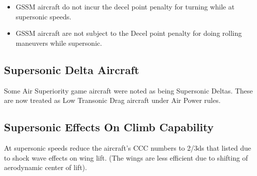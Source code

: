 \begin{advancedrules}
    \begin{itemize}

        \item
            GSSM aircraft do not incur the decel point penalty for turning while at supersonic speeds.

        \item
            GSSM aircraft are not subject to the Decel point penalty for doing rolling maneuvers while supersonic.

    \end{itemize}

    \subsection{Supersonic Delta Aircraft} Some Air Superiority game aircraft were noted as being Supersonic Deltas. These are now treated as Low Transonic Drag aircraft under Air Power rules.

    \subsection{Supersonic Effects On Climb Capability} At supersonic speeds reduce the aircraft's CCC numbers to 2/3ds that listed due to shock wave effects on wing lift. (The wings are less efficient due to shifting of aerodynamic center of lift).



\end{advancedrules}
